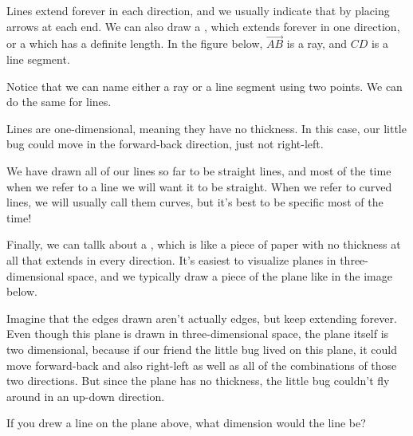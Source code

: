 \documentclass{ximera}
\begin{document}
Lines extend forever in each direction, and we usually indicate that by placing arrows at each end. We can also draw a , which extends forever in one direction, or a  which has a definite length. In the figure below, $\overrightarrow{AB}$ is a ray, and $CD$ is a line segment.
\begin{image}
\end{image}
Notice that we can name either a ray or a line segment using two points. We can do the same for lines.

Lines are one-dimensional, meaning they have no thickness. In this case, our little bug could move in the forward-back direction, just not right-left.

We have drawn all of our lines so far to be straight lines, and most of the time when we refer to a line we will want it to be straight. When we refer to curved lines, we will usually call them curves, but it's best to be specific most of the time!

Finally, we can tallk about a , which is like a piece of paper with no thickness at all that extends in every direction. It's easiest to visualize planes in three-dimensional space, and we typically draw a piece of the plane like in the image below.
\begin{image}
\end{image}
Imagine that the edges drawn aren't actually edges, but keep extending forever. Even though this plane is drawn in three-dimensional space, the plane itself is two dimensional, because if our friend the little bug lived on this plane, it could move forward-back and also right-left as well as all of the combinations of those two directions. But since the plane has no thickness, the little bug couldn't fly around in an up-down direction.

\begin{question}
If you drew a line on the plane above, what dimension would the line be?
\begin{multipleChoice}
\end{multipleChoice}
\end{question}
\end{document}
